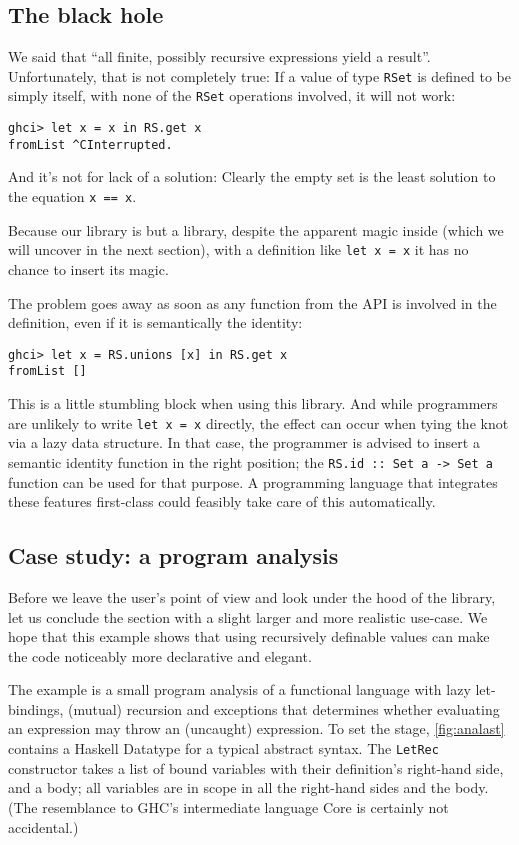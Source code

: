 \documentclass[manuscript,screen,acmsmall]{acmart}
\begin{document}
\subsection{The black hole}\label{sec:blackhole}

We said that “all finite, possibly recursive expressions yield a result”. Unfortunately, that is not completely true: If a value of type \verb|RSet| is defined to be simply itself, with none of the \verb|RSet| operations involved, it will not work:
\begin{verbatim}
ghci> let x = x in RS.get x
fromList ^CInterrupted.
\end{verbatim}
And it’s not for lack of a solution: Clearly the empty set is the least solution to the equation \verb|x == x|.

Because our library is but a library, despite the apparent magic inside (which we will uncover in the next section), with a definition like \verb|let x = x| it has no chance to insert its magic.

The problem goes away as soon as any function from the API is involved in the definition, even if it is semantically the identity:
\begin{verbatim}
ghci> let x = RS.unions [x] in RS.get x
fromList []
\end{verbatim}

This is a little stumbling block when using this library. And while programmers are unlikely to write \verb|let x = x| directly, the effect can occur when tying the knot via a lazy data structure. In that case, the programmer is advised to insert a semantic identity function in the right position; the \verb|RS.id :: Set a -> Set a| function can be used for that purpose.
A programming language that integrates these features first-class could feasibly take care of this automatically.

\subsection{Case study: a program analysis}

Before we leave the user's point of view and look under the hood of the library, let us conclude the section with a slight larger and more realistic use-case. We hope that this example shows that using recursively definable values can make the code noticeably more declarative and elegant.

The example is a small program analysis of a functional language with lazy let-bindings, (mutual) recursion and exceptions that determines whether evaluating an expression may throw an (uncaught) expression. To set the stage, \cref{fig:analast} contains a Haskell Datatype for a typical abstract syntax. The \verb|LetRec| constructor takes a list of bound variables with their definition's  right-hand side, and a body; all variables are in scope in all the right-hand sides and the body.
(The resemblance to GHC's intermediate language Core \citep{secrets} is certainly not accidental.)
\end{document}
